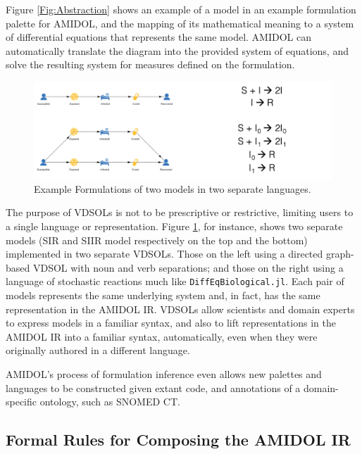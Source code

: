 \documentclass[12pt]{galois-whitepaper}
\begin{document}
  Figure \ref{Fig:Abstraction} shows an example of a model in an
  example formulation palette for AMIDOL, and the mapping of its
  mathematical meaning to a system of differential equations that
  represents the same model.  AMIDOL can automatically translate the
  diagram into the provided system of equations, and solve the
  resulting system for measures defined on the formulation.
  
  \begin{figure}
    \centering
    \includegraphics[width=\textwidth]{vdsol-formulations.png}
    \caption{Example Formulations of two models in two separate languages.}
    \label{Fig:Formulations}
  \end{figure}

  The purpose of VDSOLs is not to be prescriptive or restrictive,
  limiting users to a single language or representation.  Figure
  \ref{Fig:Formulations}, for instance, shows two separate models (SIR
  and SIIR model respectively on the top and the bottom) implemented
  in two separate VDSOLs.  Those on the left using a directed
  graph-based VDSOL with noun and verb separations; and those on the
  right using a language of stochastic reactions much like
  \texttt{DiffEqBiological.jl}.  Each pair of models represents the
  same underlying system and, in fact, has the same representation in
  the AMIDOL IR.  VDSOLs allow scientists and domain experts to
  express models in a familiar syntax, and also to lift
  representations in the AMIDOL IR into a familiar syntax,
  automatically, even when they were originally authored in a
  different language.

  AMIDOL's process of formulation inference even allows new palettes
  and languages to be constructed given extant code, and annotations
  of a domain-specific ontology, such as SNOMED CT.

\subsection{Formal Rules for Composing the AMIDOL IR}
\end{document}
